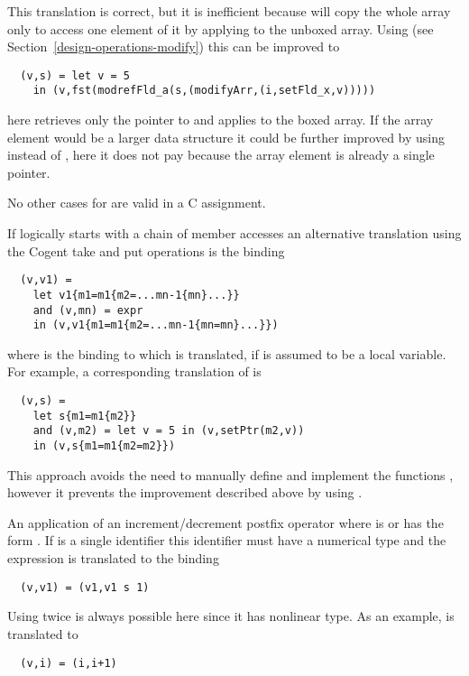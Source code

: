 This translation is correct, but it is inefficient because  will copy the whole array  only to access
one element of it by applying  to the unboxed array. Using  (see Section~\ref{design-operations-modify}) 
this can be improved to
\begin{verbatim}
  (v,s) = let v = 5
    in (v,fst(modrefFld_a(s,(modifyArr,(i,setFld_x,v)))))
\end{verbatim}
here  retrieves only the pointer to  and applies  to the boxed array. If the array element
would be a larger data structure it could be further improved by using  instead of , here it does
not pay because the array element is already a single pointer.

No other cases for  are valid in a C assignment.

If  logically starts with a chain of member accesses  an alternative translation using the Cogent
take and put operations is the binding
\begin{verbatim}
  (v,v1) = 
    let v1{m1=m1{m2=...mn-1{mn}...}}
    and (v,mn) = expr
    in (v,v1{m1=m1{m2=...mn-1{mn=mn}...}})
\end{verbatim}
where  is the binding to which  is translated, if  is assumed to be a local variable. 
For example, a corresponding translation of  is
\begin{verbatim}
  (v,s) = 
    let s{m1=m1{m2}}
    and (v,m2) = let v = 5 in (v,setPtr(m2,v))
    in (v,s{m1=m1{m2=m2}})
\end{verbatim}
This approach avoids the need to manually define and implement the functions , however it prevents the improvement
described above by using .

An application of an increment/decrement postfix operator  where  is \code{+} or \code{-} has the form
. If  is a single identifier  this identifier must have a numerical type and the expression 
is translated to the binding
\begin{verbatim}
  (v,v1) = (v1,v1 s 1)
\end{verbatim}
Using  twice is always possible here since it has nonlinear type. As an example,  is translated to
\begin{verbatim}
  (v,i) = (i,i+1)
\end{verbatim}

